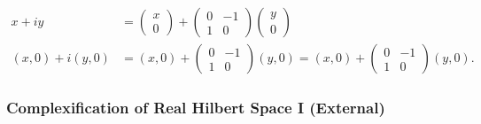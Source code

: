 \documentclass[aps,preprint]{revtex4}
\begin{document}
\begin{align}
x+iy& =\left( 
\begin{array}{c}
x \\ 
0%
\end{array}%
\right) +\left( 
\begin{array}{cc}
0 & -1 \\ 
1 & 0%
\end{array}%
\right) \left( 
\begin{array}{c}
y \\ 
0%
\end{array}%
\right) \\
\left( x,0\right) +i\left( y,0\right) & =\left( x,0\right) +\left( 
\begin{array}{cc}
0 & -1 \\ 
1 & 0%
\end{array}%
\right) \left( y,0\right) =\left( x,0\right) +\left( 
\begin{array}{cc}
0 & -1 \\ 
1 & 0%
\end{array}%
\right) \left( y,0\right) .
\end{align}

\subsubsection{Complexification of Real Hilbert Space I (External)}
\end{document}
